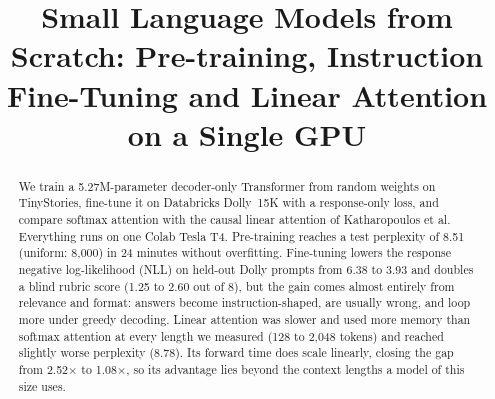 \documentclass[conference]{IEEEtran}
\begin{document}
\title{Small Language Models from Scratch: Pre-training, Instruction Fine-Tuning and Linear Attention on a Single GPU}

\author{
\and
{}
\and
{}
}

\maketitle

\begin{abstract}
We train a 5.27M-parameter decoder-only Transformer from random weights on TinyStories, fine-tune it on Databricks
Dolly~15K with a response-only loss, and compare softmax attention with the causal linear attention of Katharopoulos
et al. Everything runs on one Colab Tesla T4. Pre-training reaches a test perplexity of 8.51 (uniform: 8{,}000) in
24 minutes without overfitting. Fine-tuning lowers the response negative log-likelihood (NLL) on held-out Dolly
prompts from 6.38 to 3.93 and doubles a blind rubric score (1.25 to 2.60 out of 8), but the gain comes almost entirely
from relevance and format: answers become instruction-shaped, are usually wrong, and loop more under greedy decoding.
Linear attention was slower and used more memory than softmax attention at every length we measured (128 to 2{,}048
tokens) and reached slightly worse perplexity (8.78). Its forward time does scale linearly, closing the gap from
2.52$\times$ to 1.08$\times$, so its advantage lies beyond the context lengths a model of this size uses.
\end{abstract}
\end{document}
